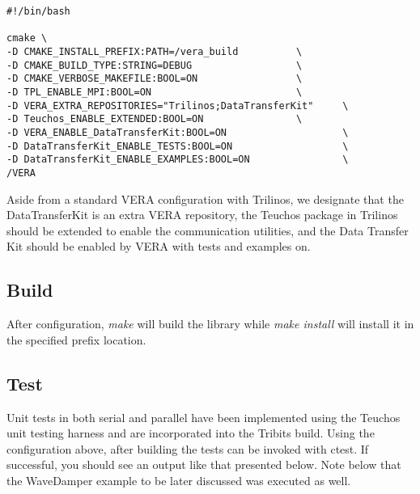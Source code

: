 \documentclass[letterpaper]{article}
\begin{document}
\begin{verbatim}
#!/bin/bash

cmake \
-D CMAKE_INSTALL_PREFIX:PATH=/vera_build          \
-D CMAKE_BUILD_TYPE:STRING=DEBUG                  \
-D CMAKE_VERBOSE_MAKEFILE:BOOL=ON                 \
-D TPL_ENABLE_MPI:BOOL=ON                         \
-D VERA_EXTRA_REPOSITORIES="Trilinos;DataTransferKit"     \
-D Teuchos_ENABLE_EXTENDED:BOOL=ON                \
-D VERA_ENABLE_DataTransferKit:BOOL=ON                    \
-D DataTransferKit_ENABLE_TESTS:BOOL=ON                   \
-D DataTransferKit_ENABLE_EXAMPLES:BOOL=ON                \
/VERA
\end{verbatim}

Aside from a standard VERA configuration with Trilinos, we designate
that the DataTransferKit is an extra VERA repository, the Teuchos package in
Trilinos should be extended to enable the communication utilities, and
the Data Transfer Kit should be enabled by VERA with tests and examples
on.

\subsection{Build}

After configuration, {\sl make} will build the library while {\sl make
  install} will install it in the specified prefix location.

\subsection{Test}
Unit tests in both serial and parallel have been implemented using the
Teuchos unit testing harness and are incorporated into the Tribits
build. Using the configuration above, after building the tests can be
invoked with ctest. If successful, you should see an output like that
presented below. Note below that the WaveDamper example to be later
discussed was executed as well.
\end{document}
